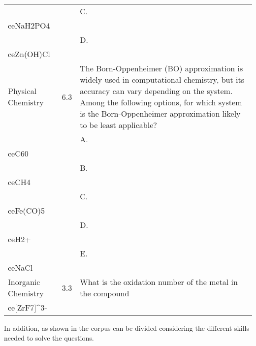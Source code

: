 \begin{table*}[!t]
\begin{tabular}{p{2.7cm}cp{10cm}}
        & & C. \\ce{NaH2PO4} \\
        & & D. \\ce{Zn(OH)Cl} \\
        \midrule
        Physical Chemistry & 6.3 & The Born-Oppenheimer (BO) approximation is widely used in computational chemistry, but its accuracy can vary depending on the system. Among the following options, for which system is the Born-Oppenheimer approximation likely to be least applicable? \\
        & & A. \\ce{C60} \\
        & & B. \\ce{CH4} \\
        & & C. \\ce{Fe(CO)5} \\
        & & D. \\ce{H2+} \\
        & & E. \\ce{NaCl} \\
        \midrule
        Inorganic Chemistry & 3.3 & What is the oxidation number of the metal in the compound \\ce{[ZrF7]^{3-}}\\
    \end{tabular}
    \label{tab:chembench_corpus_topic}
\end{table*}

In addition, as shown in  the \chembench corpus can be divided considering the different skills needed to solve the questions.

